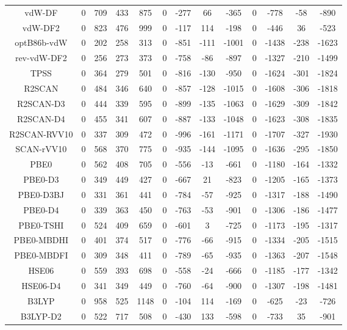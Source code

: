 \begin{table}[ht]
\begin{tabular}{ccccccccccccc}
vdW-DF & 0 & 709 & 433 & 875 & 0 & -277 & 66 & -365 & 0 & -778 & -58 & -890 \\ 
vdW-DF2 & 0 & 823 & 476 & 999 & 0 & -117 & 114 & -198 & 0 & -446 & 36 & -523 \\ 
optB86b-vdW & 0 & 202 & 258 & 313 & 0 & -851 & -111 & -1001 & 0 & -1438 & -238 & -1623 \\ 
rev-vdW-DF2 & 0 & 256 & 273 & 373 & 0 & -758 & -86 & -897 & 0 & -1327 & -210 & -1499 \\ 
TPSS & 0 & 364 & 279 & 501 & 0 & -816 & -130 & -950 & 0 & -1624 & -301 & -1824 \\ 
R2SCAN & 0 & 484 & 346 & 640 & 0 & -857 & -128 & -1015 & 0 & -1608 & -306 & -1818 \\ 
R2SCAN-D3 & 0 & 444 & 339 & 595 & 0 & -899 & -135 & -1063 & 0 & -1629 & -309 & -1842 \\ 
R2SCAN-D4 & 0 & 455 & 341 & 607 & 0 & -887 & -133 & -1048 & 0 & -1623 & -308 & -1835 \\ 
R2SCAN-RVV10 & 0 & 337 & 309 & 472 & 0 & -996 & -161 & -1171 & 0 & -1707 & -327 & -1930 \\ 
SCAN-rVV10 & 0 & 568 & 370 & 775 & 0 & -935 & -144 & -1095 & 0 & -1636 & -295 & -1850 \\ 
PBE0 & 0 & 562 & 408 & 705 & 0 & -556 & -13 & -661 & 0 & -1180 & -164 & -1332 \\ 
PBE0-D3 & 0 & 349 & 449 & 427 & 0 & -667 & 21 & -823 & 0 & -1205 & -165 & -1373 \\ 
PBE0-D3BJ & 0 & 331 & 361 & 441 & 0 & -784 & -57 & -925 & 0 & -1317 & -188 & -1490 \\ 
PBE0-D4 & 0 & 339 & 363 & 450 & 0 & -763 & -53 & -901 & 0 & -1306 & -186 & -1477 \\ 
PBE0-TSHI & 0 & 524 & 409 & 659 & 0 & -601 & 3 & -725 & 0 & -1173 & -195 & -1317 \\ 
PBE0-MBDHI & 0 & 401 & 374 & 517 & 0 & -776 & -66 & -915 & 0 & -1334 & -205 & -1515 \\ 
PBE0-MBDFI & 0 & 309 & 348 & 411 & 0 & -789 & -65 & -935 & 0 & -1363 & -207 & -1548 \\ 
HSE06 & 0 & 559 & 393 & 698 & 0 & -558 & -24 & -666 & 0 & -1185 & -177 & -1342 \\ 
HSE06-D4 & 0 & 341 & 349 & 449 & 0 & -760 & -64 & -900 & 0 & -1307 & -198 & -1481 \\ 
B3LYP & 0 & 958 & 525 & 1148 & 0 & -104 & 114 & -169 & 0 & -625 & -23 & -726 \\ 
B3LYP-D2 & 0 & 522 & 717 & 508 & 0 & -430 & 133 & -598 & 0 & -733 & 35 & -901 \\ 

\end{tabular}
\end{table}
